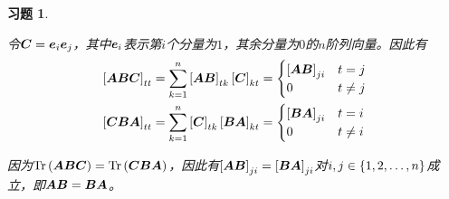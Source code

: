 \documentclass{ctexart}
\newtheorem{problem}{习题}[section]
\begin{document}
\begin{problem}\


令\(\matc=\vece_i\vece_j\)，其中\(\vece_i\)表示第\(i\)个分量为\(1\)，其余分量为\(0\)的\(n\)阶列向量。因此有
\begin{align*}
    \mat{\mata\matb\matc}_{tt} & =\sum_{k=1}^n\mat{\mata\matb}_{tk}\mat{\matc}_{kt}=
    \begin{cases}
        \mat{\mata\matb}_{ji} & t=j     \\
        0                     & t\neq j
    \end{cases}                                                       \\
    \mat{\matc\matb\mata}_{tt} & =\sum_{k=1}^n\mat{\matc}_{tk}\mat{\matb\mata}_{kt}=
    \begin{cases}
        \mat{\matb\mata}_{ji} & t=i     \\
        0                     & t\neq i
    \end{cases}
\end{align*}

因为\(\trace{\mata\matb\matc}=\trace{\matc\matb\mata}\)，因此有\(\mat{\mata\matb}_{ji}=\mat{\matb\mata}_{ji}\)对\(i,j\in\setof{1,2,\dots,n}\)成立，即\(\mata\matb=\matb\mata\)。

\end{problem}
\end{document}
